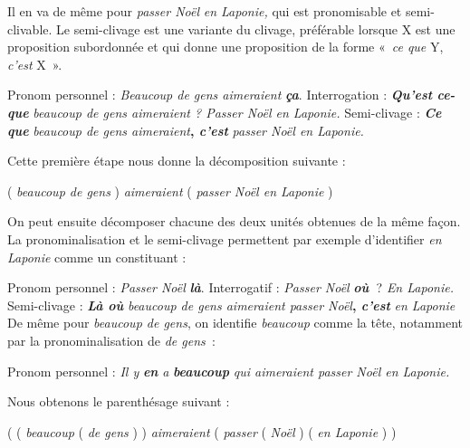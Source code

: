 Il en va de même pour \textit{passer Noël} \textit{en Laponie,} qui est pronomisable et semi-clivable. Le semi-clivage est une variante du clivage, préférable lorsque X est une proposition subordonnée et qui donne une proposition de la forme «~\textit{ce que}
Y, \textit{c'est} X~».

\ea
  \ea Pronom personnel : \textit{Beaucoup de gens aimeraient} \textbf{\textit{ça}}.
  \ex Interrogation : \textbf{\textit{Qu’est} \textit{ce-que}} \textit{beaucoup de gens aimeraient ? Passer Noël en Laponie.}
  \ex Semi-clivage : \textbf{\textit{Ce que}} \textit{beaucoup de gens aimeraient}\textbf{, \textit{c’est}} \textit{passer Noël en Laponie.}
\z\z

Cette première étape nous donne la décomposition suivante :

\ea
   ( \textit{beaucoup de gens} ) \textit{aimeraient} ( \textit{passer Noël en Laponie} )
\z

On peut ensuite décomposer chacune des deux unités obtenues de la même façon. La pronominalisation et le semi-clivage permettent par exemple d’identifier \textit{en Laponie} comme un constituant :

\ea
\ea Pronom personnel : \textit{Passer Noël} \textbf{\textit{là}}.
\ex Interrogatif : \textit{Passer Noël} \textbf{\textit{où~}}? \textit{En Laponie.}
\ex Semi-clivage :  \textbf{\textit{Là où}} \textit{beaucoup de gens aimeraient passer Noël}\textbf{, \textit{c’est}} \textit{en Laponie}
\z\z
De même pour \textit{beaucoup de gens}, on identifie \textit{beaucoup} comme la tête, notamment par la pronominalisation de \textit{de gens~}:

\ea
Pronom personnel : \textit{Il y} \textbf{\textit{en}} \textit{a} \textbf{\textit{beaucoup}} \textit{qui aimeraient passer Noël en Laponie.}    
\z

Nous obtenons le parenthésage suivant :

\ea
      ( ( \textit{beaucoup}  ( \textit{de gens} ) )  \textit{aimeraient}  ( \textit{passer}  ( \textit{Noël} ) ( \textit{en Laponie} ) )
\z

